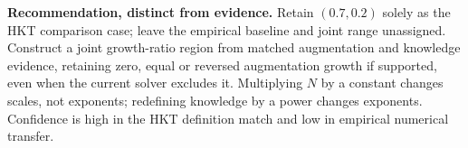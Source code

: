\noindent\textbf{Recommendation, distinct from evidence.}
Retain $(0.7,0.2)$ solely as the HKT comparison case; leave the empirical
baseline and joint range unassigned. Construct a joint growth-ratio region
from matched augmentation and knowledge evidence, retaining zero, equal or
reversed augmentation growth if supported, even when the current solver
excludes it. Multiplying $N$ by a constant changes scales, not exponents;
redefining knowledge by a power changes exponents. Confidence is high in
the HKT definition match and low in empirical numerical transfer.
